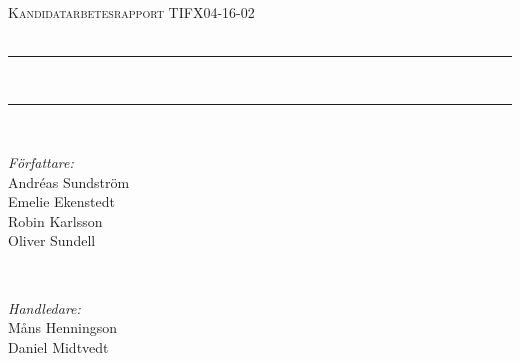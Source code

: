 \clearpage
{}
\thispagestyle{empty}


\newcommand{\andsunds}{andsunds@student.chalmers.se}
\newcommand{\emeeke}{emeeke@student.chalmers.se}
\newcommand{\robka}{robka@student.chalmers.se}
\newcommand{\soliver}{soliver@student.chalmers.se}

\renewcommand{\thefootnote}{\fnsymbol{footnote}}


\newcommand{\HRule}{\rule{\linewidth}{0.5mm}} %

\begin{center}
 

\textsc{\huge \skola}\\[1.5cm] %
\textsc{\Large Kandidatarbetesrapport TIFX04-16-02 }\\[0.2cm] %
\textsc{\large \institution  }\\[0.5cm] %


\HRule 
\\[0.4cm]
\textbf{\huge \titel} \setlength{\parskip}{0.4cm}

\Large \undertitel \setlength{\parskip}{0.4cm}
\HRule \\[1.5cm]


\begin{minipage}{0.4\textwidth}
\begin{flushleft} \large
\emph{Författare:}\\
Andréas Sundström\footnotemark{} \\
Emelie Ekenstedt\footnotemark{} \\
Robin Karlsson\footnotemark{} \\
Oliver Sundell\footnotemark{}
\end{flushleft}
\end{minipage}
~
\begin{minipage}{0.4\textwidth}
\begin{flushright} \large
\emph{Handledare:} \\
Måns Henningson\\
Daniel Midtvedt\\
\end{flushright}
\end{minipage}\\[2cm]



\end{center}
